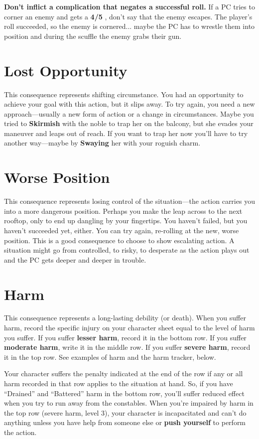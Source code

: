 \documentclass[11pt,fleqn,a5paper]{book}
\newcommand{\gameterm}[1]{\textbf{#1}}
\begin{document}
\textbf{Don’t inflict a complication that negates a successful roll.} If a PC tries to corner an enemy and gets a \gameterm{4/5} , don’t say that the enemy escapes. The player’s roll succeeded, so the enemy is cornered... maybe the PC has to wrestle them into position and during the scuffle the enemy grabs their gun.

\section{Lost Opportunity}

This consequence represents shifting circumstance. You had an opportunity to achieve your goal with this action, but it slips away. To try again, you need a new approach---usually a new form of action or a change in circumstances. Maybe you tried to \gameterm{Skirmish}  with the noble to trap her on the balcony, but she evades your maneuver and leaps out of reach. If you want to trap her now you’ll have to try another way---maybe by \gameterm{Swaying}  her with your roguish charm.

\section{Worse Position}

This consequence represents losing control of the situation---the action carries you into a more dangerous position. Perhaps you make the leap across to the next rooftop, only to end up dangling by your fingertips. You haven’t failed, but you haven’t succeeded yet, either. You can try again, re-rolling at the new, worse position. This is a good consequence to choose to show escalating action. A situation might go from controlled, to risky, to desperate as the action plays out and the PC gets deeper and deeper in trouble.

\section{Harm}

This consequence represents a long-lasting debility (or death). When you suffer harm, record the specific injury on your character sheet equal to the level of harm you suffer. If you suffer\textbf{ lesser harm}, record it in the bottom row. If you suffer \textbf{moderate harm}, write it in the middle row. If you suffer \textbf{severe harm}, record it in the top row. See examples of harm and the harm tracker, below.

Your character suffers the penalty indicated at the end of the row if any or all harm recorded in that row applies to the situation at hand. So, if you have “Drained” and “Battered” harm in the bottom row, you’ll suffer reduced effect when you try to run away from the constables. When you’re impaired by harm in the top row (severe harm, level 3), your character is incapacitated and can’t do anything unless you have help from someone else or \textbf{push yourself} to perform the action.
\end{document}
